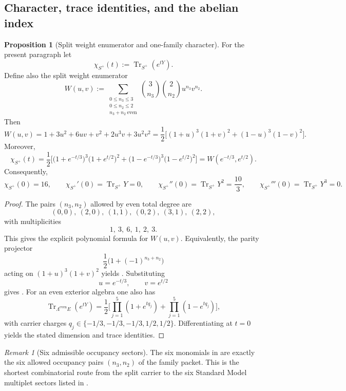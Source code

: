 \documentclass[11pt,a4paper]{article}
\theoremstyle{definition}
\newtheorem{proposition}[theorem]{Proposition}
\theoremstyle{remark}
\newtheorem*{remark}{Remark}
\DeclareMathOperator{\tr}{Tr}
\begin{document}
\subsection{Character, trace identities, and the abelian index}

\begin{proposition}[Split weight enumerator and one-family character]
\label{prop:split-weight-enumerator}
For the present paragraph let
\[
\chi_{S^+}(t):=\tr_{S^+}(e^{tY}).
\]
Define also the split weight enumerator
\[
W(u,v)
:=
\sum_{\substack{0\le n_3\le 3\\ 0\le n_2\le 2\\ n_3+n_2\ \mathrm{even}}}
\binom{3}{n_3}\binom{2}{n_2}u^{n_3}v^{n_2}.
\]
Then
\begin{equation}
\label{eq:split-weight-enumerator}
W(u,v)
=
1+3u^2+6uv+v^2+2u^3v+3u^2v^2
=
\frac12\Big[(1+u)^3(1+v)^2+(1-u)^3(1-v)^2\Big].
\end{equation}
Moreover,
\begin{equation}
\label{eq:family-character}
\chi_{S^+}(t)
=
\frac12\Big[
\bigl(1+e^{-t/3}\bigr)^3\bigl(1+e^{t/2}\bigr)^2
+
\bigl(1-e^{-t/3}\bigr)^3\bigl(1-e^{t/2}\bigr)^2
\Big]
=
W(e^{-t/3},e^{t/2}).
\end{equation}
Consequently,
\[
\chi_{S^+}(0)=16,
\qquad
\chi_{S^+}'(0)=\tr_{S^+}Y=0,
\qquad
\chi_{S^+}''(0)=\tr_{S^+}Y^2=\frac{10}{3},
\qquad
\chi_{S^+}'''(0)=\tr_{S^+}Y^3=0.
\]
\end{proposition}

\begin{proof}
The pairs $(n_3,n_2)$ allowed by even total degree are
\[
(0,0),\ (2,0),\ (1,1),\ (0,2),\ (3,1),\ (2,2),
\]
with multiplicities
\[
1,\ 3,\ 6,\ 1,\ 2,\ 3.
\]
This gives the explicit polynomial formula for $W(u,v)$. Equivalently, the parity projector
\[
\frac12\bigl(1+(-1)^{n_3+n_2}\bigr)
\]
acting on $(1+u)^3(1+v)^2$ yields . Substituting
\[
u=e^{-t/3},
\qquad
v=e^{t/2}
\]
gives . For an even exterior algebra one also has
\[
\tr_{\Lambda^{\mathrm{even}}E}(e^{tY})
=
\frac12\Big[\prod_{j=1}^5(1+e^{tq_j})+\prod_{j=1}^5(1-e^{tq_j})\Big],
\]
with carrier charges $q_j\in\{-1/3,-1/3,-1/3,1/2,1/2\}$. Differentiating at $t=0$ yields the stated dimension and trace identities.
\end{proof}

\begin{remark}[Six admissible occupancy sectors]
The six monomials in  are exactly the six allowed occupancy pairs $(n_3,n_2)$ of the family packet. This is the shortest combinatorial route from the split carrier to the six Standard Model multiplet sectors listed in .
\end{remark}
\end{document}
